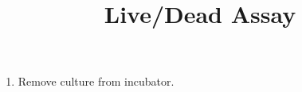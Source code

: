\documentclass[11pt, oneside]{article}   	%
\title{Live/Dead Assay}
\begin{document}
\maketitle 							%
\date{}							%

\begin{enumerate}

\item Remove culture from incubator.


\end{enumerate}
\end{document}

